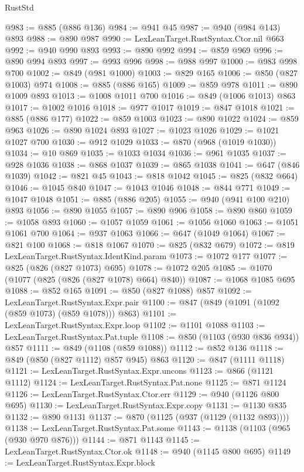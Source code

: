 \begin{lexlean}{RustStd}
\begin{coremodule}
@983 := @885 (@886 @136)
@984 := @941 @45
@987 := @940 (@984 @143) @893
@988 := @890 @987
@990 := LexLeanTarget.RustSyntax.Ctor.nil @663
@992 := @940 @990 @893
@993 := @890 @992
@994 := @859 @969
@996 := @890 @994 @893
@997 := @993 @996
@998 := @988 @997
@1000 := @983 @998 @700
@1002 := @849 (@981 @1000)
@1003 := @829 @165
@1006 := @850 (@827 @1003) @974
@1008 := @885 (@886 @165)
@1009 := @859 @978
@1011 := @890 @1009 @893
@1013 := @1008 @1011 @700
@1016 := @849 (@1006 @1013) @863
@1017 := @1002 @1016
@1018 := @977 @1017
@1019 := @847 @1018
@1021 := @885 (@886 @177)
@1022 := @859 @1003
@1023 := @890 @1022
@1024 := @859 @963
@1026 := @890 @1024 @893
@1027 := @1023 @1026
@1029 := @1021 @1027 @700
@1030 := @912 @1029
@1033 := @870 (@968 (@1019 @1030))
@1034 := @10 @869
@1035 := @1033 @1034
@1036 := @961 @1035
@1037 := @928 @1036
@1038 := @868 @1037
@1039 := @865 @1038
@1041 := @647 (@846 @1039)
@1042 := @821 @45
@1043 := @818 @1042
@1045 := @825 (@832 @664)
@1046 := @1045 @840
@1047 := @1043 @1046
@1048 := @844 @771
@1049 := @1047 @1048
@1051 := @885 (@886 @205)
@1055 := @940 (@941 @100 @210) @893
@1056 := @890 @1055
@1057 := @890 @906
@1058 := @890 @860
@1059 := @1058 @893
@1060 := @1057 @1059
@1061 := @1056 @1060
@1063 := @1051 @1061 @700
@1064 := @937 @1063
@1066 := @647 (@1049 @1064)
@1067 := @821 @100
@1068 := @818 @1067
@1070 := @825 (@832 @679)
@1072 := @819 LexLeanTarget.RustSyntax.IdentKind.param
@1073 := @1072 @177
@1077 := @825 (@826 (@827 @1073) @695)
@1078 := @1072 @205
@1085 := @1070 (@1077 (@825 (@826 (@827 @1078) @664) @840))
@1087 := @1068 @1085 @695
@1088 := @852 @165
@1091 := @850 (@827 @1088) @857
@1092 := LexLeanTarget.RustSyntax.Expr.pair
@1100 := @847 (@849 (@1091 (@1092 (@859 @1073) (@859 @1078))) @863)
@1101 := LexLeanTarget.RustSyntax.Expr.loop
@1102 := @1101 @1088
@1103 := LexLeanTarget.RustSyntax.Pat.tuple
@1108 := @850 (@1103 (@930 @836 @934)) @857
@1111 := @849 (@1108 (@859 @1088))
@1112 := @852 @136
@1118 := @849 (@850 (@827 @1112) @857 @945) @863
@1120 := @847 (@1111 @1118)
@1121 := LexLeanTarget.RustSyntax.Expr.uncons
@1123 := @866 (@1121 @1112)
@1124 := LexLeanTarget.RustSyntax.Pat.none
@1125 := @871 @1124
@1126 := LexLeanTarget.RustSyntax.Ctor.err
@1129 := @940 (@1126 @800 @695)
@1130 := LexLeanTarget.RustSyntax.Expr.copy
@1131 := @1130 @835
@1132 := @890 @1131
@1137 := @870 (@1125 (@937 (@1129 (@1132 @893))))
@1138 := LexLeanTarget.RustSyntax.Pat.some
@1143 := @1138 (@1103 (@965 (@930 @970 @876)))
@1144 := @871 @1143
@1145 := LexLeanTarget.RustSyntax.Ctor.ok
@1148 := @940 (@1145 @800 @695)
@1149 := LexLeanTarget.RustSyntax.Expr.block

\end{coremodule}
\end{lexlean}
